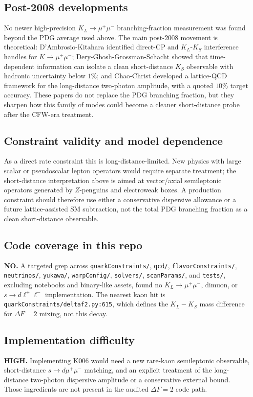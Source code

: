 \subsection*{Post-2008 developments}
No newer high-precision \(K_L\to\mu^+\mu^-\) branching-fraction measurement was
found beyond the PDG average used above.  The main post-2008 movement is
theoretical: D'Ambrosio-Kitahara identified direct-CP and \(K_L\)-\(K_S\)
interference handles for \(K\to\mu^+\mu^-\); Dery-Ghosh-Grossman-Schacht
showed that time-dependent information can isolate a clean short-distance
\(K_S\) observable with hadronic uncertainty below \(1\%\); and Chao-Christ
developed a lattice-QCD framework for the long-distance two-photon amplitude,
with a quoted \(10\%\) target accuracy.  These papers do not replace the PDG
branching fraction, but they sharpen how this family of modes could become a
cleaner short-distance probe after the CFW-era treatment.

\subsection*{Constraint validity and model dependence}
As a direct rate constraint this is long-distance-limited.  New physics with
large scalar or pseudoscalar lepton operators would require separate treatment;
the short-distance interpretation above is aimed at vector/axial semileptonic
operators generated by \(Z\)-penguins and electroweak boxes.  A production
constraint should therefore use either a conservative dispersive allowance or a
future lattice-assisted SM subtraction, not the total PDG branching fraction as
a clean short-distance observable.

\subsection*{Code coverage in this repo}
\textbf{NO.}  A targeted grep across \texttt{quarkConstraints/}, \texttt{qcd/},
\texttt{flavorConstraints/}, \texttt{neutrinos/}, \texttt{yukawa/},
\texttt{warpConfig/}, \texttt{solvers/}, \texttt{scanParams/}, and
\texttt{tests/}, excluding notebooks and binary-like assets, found no
\(K_L\to\mu^+\mu^-\), dimuon, or \(s\to d\ell^+\ell^-\) implementation.  The
nearest kaon hit is \texttt{quarkConstraints/deltaf2.py:615}, which defines the
\(K_L-K_S\) mass difference for \(\Delta F=2\) mixing, not this decay.

\subsection*{Implementation difficulty}
\textbf{HIGH.}  Implementing K006 would need a new rare-kaon semileptonic observable,
short-distance \(s\to d\mu^+\mu^-\) matching, and an explicit treatment of the
long-distance two-photon dispersive amplitude or a conservative external bound.
Those ingredients are not present in the audited \(\Delta F=2\) code path.

